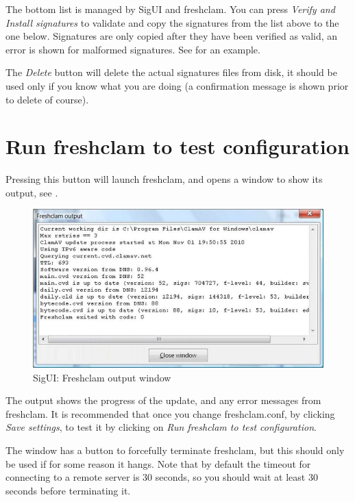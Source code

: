 The bottom list is managed by SigUI and \gls{freshclam}. You can press \emph{Verify and Install signatures} to validate and copy the signatures from the list above to the one below.
Signatures are only copied after they have been verified as valid, an error is shown for malformed signatures. See  for an example.

The \emph{Delete} button will delete the actual signatures files from disk, it should be used only if you know what you are doing (a confirmation message is shown prior to delete of course).

\section{Run freshclam to test configuration}
\label{sec:runfreshclam}

Pressing this button will launch \gls{freshclam}, and opens a window to show its output, see .

\begin{figure}
\centering
\includegraphics{sigui_run.jpg}
\caption{SigUI: Freshclam output window}
\label{fig:freshclamout}
\end{figure}

The output shows the progress of the update, and any error messages from \gls{freshclam}.
It is recommended that once you change \gls{freshclam.conf}, by clicking \emph{Save settings}, to test it by clicking on \emph{Run freshclam to test configuration}.

The window has a button to forcefully terminate \gls{freshclam}, but this should only be used if for some reason it hangs. Note that by default the timeout for connecting to a remote server is 30 seconds, so you should wait at least 30 seconds before terminating it.

